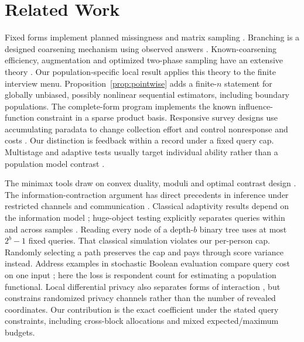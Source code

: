 \section{Related Work}
Fixed forms implement planned missingness and matrix sampling
\citep{raghunathan1995,graham2006,adiguzel2008,chipperfield2018,ncesbooklets}.
Branching is a designed coarsening mechanism using observed answers
\citep{heitjan1991,gill1997}. Known-coarsening efficiency, augmentation
and optimized two-phase sampling have an extensive theory
\citep{robins1994,tsiatis2006,hahn2011,tao2020,berrett2024}.
Our population-specific local result applies this theory to the finite
interview menu. Proposition~\ref{prop:pointwise}
adds a finite-$n$ statement for globally unbiased, possibly nonlinear
sequential estimators, including boundary populations. The complete-form
program implements the known influence-function constraint in a sparse
product basis. Responsive survey designs use accumulating paradata to change
collection effort and control nonresponse and costs \citep{groves2006}.
Our distinction is feedback within a record under a fixed query cap.
Multistage and adaptive tests usually target individual
ability rather than a population model contrast \citep{vanderlinden2010,yan2014}.

The minimax tools draw on convex duality, moduli and optimal contrast design
\citep{donoho1991,donoho1994,juditsky2009,polyanskiy2026,elfving1952,sagnol2011}.
The information-contraction argument has direct precedents in inference
under restricted channels and communication \citep{acharya2019,barnes2020,acharya2022}.
Classical adaptivity results depend on the information model
\citep{novak1996,arias2013,gupta2016}; huge-object testing explicitly
separates queries within and across samples \citep{goldreich2022,chakraborty2023,adar2024}.
Reading every node of a depth-$b$ binary tree uses at most $2^b-1$ fixed
queries. That classical simulation violates our per-person cap. Randomly
selecting a path preserves the cap and pays through score variance instead.
Address examples in stochastic Boolean evaluation compare query cost on
one input \citep{hellerstein2022}; here the loss is respondent count for
estimating a population functional. Local differential privacy also separates
forms of interaction \citep{joseph2019}, but constrains randomized privacy
channels rather than the number of revealed coordinates. Our contribution is
the exact coefficient under the stated query constraints, including
cross-block allocations and mixed expected/maximum budgets.

